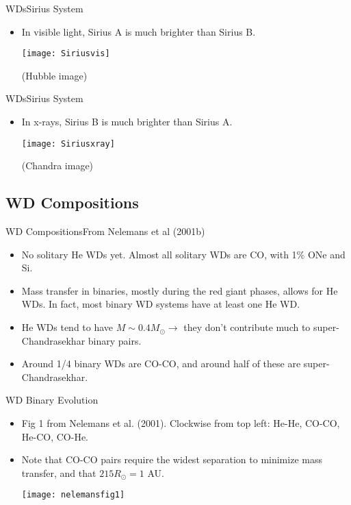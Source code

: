 \documentclass{beamer}
\begin{document}
\begin{frame}{WDs}{Sirius System}
  \begin{itemize}
  \item {In visible light, Sirius A is much brighter than Sirius B.}

    \texttt{[image: Siriusvis]}

    (Hubble image)
    \end{itemize}
\end{frame}

\begin{frame}{WDs}{Sirius System}
  \begin{itemize}
    \item {In x-rays, Sirius B is much brighter than Sirius A.}
    
      \texttt{[image: Siriusxray]}
     
      (Chandra image)
  \end{itemize}
\end{frame}

\subsection{WD Compositions}

\begin{frame}{WD Compositions}{From Nelemans et al (2001b)}
  \begin{itemize}
    \item {No solitary He WDs yet. Almost all solitary WDs are CO, with 1\% ONe and Si.}
    \item {Mass transfer in binaries, mostly during the red giant phases, allows for He WDs. In fact, most binary WD systems have at least one He WD.}
    \item {He WDs tend to have $M\sim0.4M_{\odot}\rightarrow$ they don't contribute much to super-Chandrasekhar binary pairs.}
    \item {Around 1/4 binary WDs are CO-CO, and around half of these are super-Chandrasekhar.}
  \end{itemize}
\end{frame}

\begin{frame}{WD Binary Evolution}
  \begin{itemize}
    \item {Fig 1 from Nelemans et al. (2001). Clockwise from top left: He-He, CO-CO, He-CO, CO-He.}
    \item {Note that CO-CO pairs require the widest separation to minimize mass transfer, and that $215R_{\odot}=1$ AU.}
  \begin{center} \texttt{[image: nelemansfig1]}\end{center}
  \end{itemize}
\end{frame}
\end{document}

